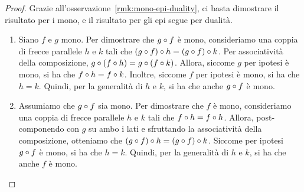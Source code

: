 \begin{proof}
	Grazie all'osservazione~\ref{rmk:mono-epi-duality},	ci basta dimostrare il risultato per i mono,	e il risultato per gli epi segue per dualità.
	\begin{enumerate}
		\item Siano \(f\) e \(g\) mono. Per dimostrare che \(g \circ f\) è mono, consideriamo una coppia di frecce parallele \(h\) e \(k\) tali che \((g \circ f) \circ h = (g \circ f) \circ k\). Per associatività della composizione, \(g \circ (f \circ h) = g \circ (f \circ k)\). Allora, siccome \(g\) per ipotesi è mono, si ha che \(f \circ h = f \circ k\). Inoltre, siccome \(f\) per ipotesi è mono, si ha che \(h = k\). Quindi, per la generalità di \(h\) e \(k\), si ha che anche \(g \circ f\) è mono.
		\item Assumiamo che \(g \circ f\) sia mono. Per dimostrare che \(f\) è mono, consideriamo una coppia di frecce parallele \(h\) e \(k\) tali che \(f \circ h = f \circ h\). Allora, post-componendo con \(g\) su ambo i lati e sfruttando la associatività della composizione, otteniamo che \((g \circ f) \circ h = (g \circ f) \circ k\). Siccome per ipotesi \(g \circ f\) è mono, si ha che \(h = k\). Quindi, per la generalità di \(h\) e \(k\), si ha che anche \(f\) è mono. \qedhere
	\end{enumerate}
\end{proof}

